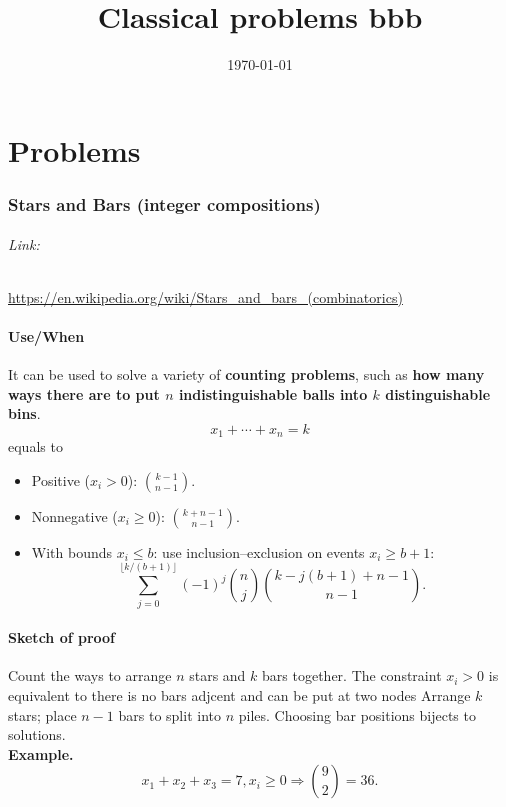 \documentclass[11pt,A4,twoside]{article}
\let\oldsection\section
\renewcommand{\section}{\FloatBarrier\oldsection}
\let\oldsubsection\subsection
\renewcommand{\subsection}{\FloatBarrier\oldsubsection}
\numberwithin{equation}{section}
\theoremstyle{definition}
\theoremstyle{remark}
\newcommand{\Binom}[2]{\binom{#1}{#2}}
\begin{document}
\title{Classical problems bbb}




\date{\today}

\maketitle
\tableofcontents
\part{Problems}
\section{Stars and Bars (integer compositions)}
\paragraph{Link:} \url{https://en.wikipedia.org/wiki/Stars_and_bars_(combinatorics)}

\subsection{Use/When}
It can be used to solve a variety of \textbf{counting problems}, such as \textbf{how many ways there are to put $n$ indistinguishable balls into $k$ distinguishable bins}.
\begin{equation}
x_1+\cdots+x_n=k
\end{equation}
equals to
\begin{itemize}
\item Positive ($x_i > 0$): $\displaystyle \binom{k-1}{n-1}$.
\item Nonnegative ($x_i \ge 0$): $\displaystyle \binom{k+n-1}{n-1}$.
\item With bounds $x_i \le b$: use inclusion--exclusion on events $x_i \ge b+1$:
\[
\sum_{j=0}^{\lfloor k/(b+1)\rfloor}(-1)^j \binom{n}{j}\binom{k-j(b+1)+n-1}{n-1}.
\]
\end{itemize}
\subsection{Sketch of proof} 
Count the ways to arrange $n$ stars and $k$ bars together. The constraint $x_i>0$ is equivalent to there is no bars adjcent and can be put at two nodes
Arrange \(k\) stars; place \(n-1\) bars to split into \(n\) piles. Choosing bar positions bijects to solutions.\\
\textbf{Example.} \[x_1+x_2+x_3=7, x_i\ge 0 \Rightarrow \Binom{9}{2}=36.\]
\end{document}
